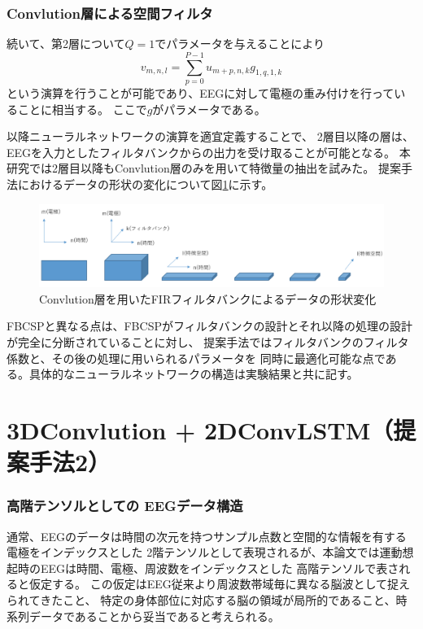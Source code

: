 \subsubsection{\rm Convlution\mc 層による空間フィルタ}
続いて、第2層について\(Q=1\)でパラメータを与えることにより
\begin{equation}
    v_{m,n,l} = \sum_{p=0}^{P-1} u_{m+p,n,k} g_{1,q,1,k}
    \label{eq:pseudoFIR}
\end{equation} 
という演算を行うことが可能であり、EEGに対して電極の重み付けを行っていることに相当する。
ここで\(g\)がパラメータである。

以降ニューラルネットワークの演算を適宜定義することで、
2層目以降の層は、EEGを入力としたフィルタバンクからの出力を受け取ることが可能となる。
本研究では2層目以降もConvlution層のみを用いて特徴量の抽出を試みた。
提案手法におけるデータの形状の変化について図\ref{fig:pseudFBCSP}に示す。
\begin{figure}[t]
    \centering
    \includegraphics[width=16cm]{images/pseudFBCSP.png}
    \caption{Convlution層を用いたFIRフィルタバンクによるデータの形状変化}
    \label{fig:pseudFBCSP}
\end{figure}
FBCSPと異なる点は、FBCSPがフィルタバンクの設計とそれ以降の処理の設計が完全に分断されていることに対し、
提案手法ではフィルタバンクのフィルタ係数と、その後の処理に用いられるパラメータを
同時に最適化可能な点である。具体的なニューラルネットワークの構造は実験結果と共に記す。


\section{\rm 3DConvlution + 2DConvLSTM\mc （提案手法2）}
\subsubsection{\mc 高階テンソルとしての \rm EEG\mc データ構造}
通常、EEGのデータは時間の次元を持つサンプル点数と空間的な情報を有する電極をインデックスとした
2階テンソルとして表現されるが、本論文では運動想起時のEEGは時間、電極、周波数をインデックスとした
高階テンソルで表されると仮定する。
この仮定はEEG従来より周波数帯域毎に異なる脳波として捉えられてきたこと、
特定の身体部位に対応する脳の領域が局所的であること、時系列データであることから妥当であると考えられる。

